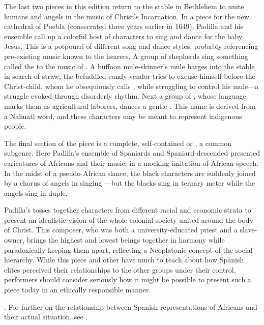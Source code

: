 The last two pieces in this edition return to the stable in Bethlehem to unite 
humans and angels in the music of Christ's Incarnation.
In a piece for the new cathedral of Puebla (consecrated three years earlier in 
1649), Padilla and his ensemble call up a colorful host of characters 
 to sing and dance for the baby Jesus.%
    \Autocites{Cashner:PadillaRhythm-AMS}[406--467]{Cashner:PhD}
This  is a potpourri of different song and dance styles, 
probably referencing pre-existing music known to the hearers.
A group of shepherds sing something called the  to the music 
of .
A buffoon mule-skinner's mule barges into the stable in search of straw; the 
befuddled candy vendor tries to excuse himself before the Christ-child, whom he 
obsequiously calls , while struggling to control his mule---a 
struggle evoked through disorderly rhythm.
Next a group of , whose language marks them as 
agricultural laborers, dances a gentle .
This name is derived from a Nahuatl word, and these characters may be meant to 
represent indigenous people.

The final section of the piece is a complete, self-contained  or 
, a common subgenre.
Here Padilla's ensemble of Spaniards and Spaniard-descended  
presented caricatures of Africans and their music, in a mocking imitation of 
African speech.
In the midst of a pseudo-African dance, the black characters are suddenly 
joined by a chorus of angels in singing ---but the blacks sing in 
ternary meter while the angels sing in duple.

Padilla's  tosses together characters from different 
racial and economic strata to present an idealistic vision of the whole 
colonial society united around the body of Christ.
This composer, who was both a university-educated priest and a slave-owner,
brings the highest and lowest beings together in harmony while paradoxically
keeping them apart, reflecting a Neoplatonic concept of the social hierarchy.%
    \Autocite{Mauleon:PadillaPalafox}
While this piece and other  have much to teach 
about how Spanish elites perceived their relationships to the other groups 
under their control, performers should consider seriously how it might be 
possible to present such a piece today in an ethically responsible manner.%
  \begin{Footnote}
      \Autocites{Baker:EthnicVC}{Baker:PerformancePostColonial}. 
      For further on the relationship between Spanish representations of Africans 
      and their actual situation, see \autocites{Molinero:Negros}{Lipski:AfroHispanic}
      {Fromont:DancingKingCongo}.
  \end{Footnote}

